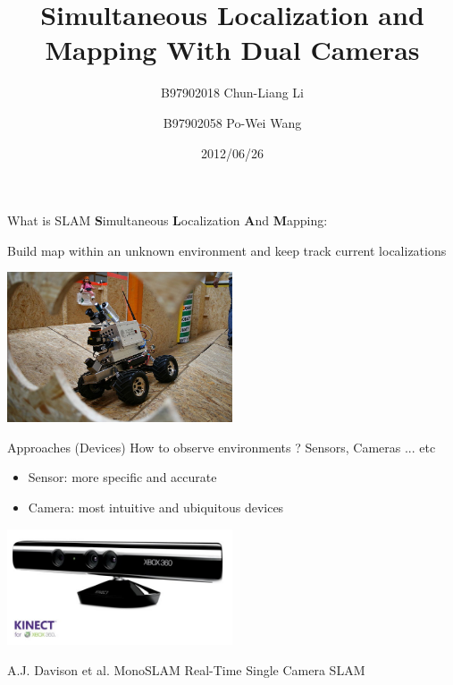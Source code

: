 \documentclass{beamer}
\title{Simultaneous Localization and Mapping With Dual Cameras}
\author{B97902018 Chun-Liang Li \and 
	B97902058 Po-Wei Wang}
\date{2012/06/26}
\begin{document}
	\begin{frame}
		\titlepage
	\end{frame}

	\begin{frame}{What is SLAM}
		\textbf{S}imultaneous \textbf{L}ocalization \textbf{A}nd \textbf{M}apping: 
		
		Build map within an unknown environment and keep track current localizations
		\begin{center}
			\includegraphics[width=0.5\textwidth]{./pics/robot.jpg} 
		\end{center}
	\end{frame}

	\begin{frame}{ Approaches (Devices) }
		How to observe environments ? Sensors, Cameras ... etc\\
		\begin{itemize}
			\item Sensor: more specific and accurate
			\item Camera: most intuitive and ubiquitous devices
		\end{itemize}
		\begin{center}
			\includegraphics[width=0.5\textwidth]{./pics/sensor.jpg} 
		\end{center}
		\uncover<2->
		{
			
			A.J. Davison et al. MonoSLAM Real-Time Single Camera SLAM
		}
	\end{frame}
	
\end{document}
